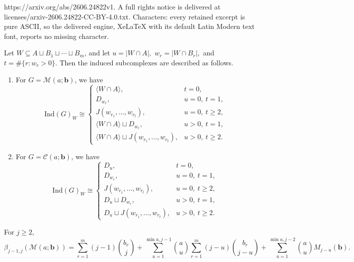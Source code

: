\documentclass[10pt,a4paper]{amsart}
\newcommand{\CC}{\mathcal{C}}
\newcommand{\MM}{\mathcal{M}}
\newcommand{\bk}[1]{\mathbf{#1}}
\newcommand{\ind}{\mathrm{Ind}}
\begin{document}
https://arxiv.org/abs/2606.24822v1. A full rights notice is delivered at licenses/arxiv-2606.24822-CC-BY-4.0.txt. Characters: every retained excerpt is pure ASCII, so the delivered engine, XeLaTeX with its default Latin Modern text font, reports no missing character.
	\begin{proposition}\label{prop:induced-models}
		Let $W\subseteq A\sqcup B_1\sqcup\cdots\sqcup B_m$, and let
		$ u=|W\cap A|, $ $ 	w_r=|W\cap B_r|, $ and $t=\#\{r:w_r>0\}. $ 	Then the induced subcomplexes are described as follows.
		
		\begin{enumerate}[label=\textup{(\roman*)},noitemsep]
			\item For $G=\MM(a;\bk{b})$, we have
			$$
			\ind(G)_W \cong
			\begin{cases}
				\langle W\cap A\rangle, & t=0,\\
				D_{w_r}, & u=0,\ t=1,\\
				J(w_{r_1},\dots,w_{r_t}), & u=0,\ t\geq 2,\\
				\langle W\cap A\rangle \sqcup D_{w_r}, & u>0,\ t=1,\\
				\langle W\cap A\rangle \sqcup J(w_{r_1},\dots,w_{r_t}), & u>0,\ t\geq 2.
			\end{cases}
			$$
			
			\item For $G=\CC(a;\bk{b})$, we have
			$$
			\ind(G)_W \cong
			\begin{cases}
				D_u, & t=0,\\
				D_{w_r}, & u=0,\ t=1,\\
				J(w_{r_1},\dots,w_{r_t}), & u=0,\ t\geq 2,\\
				D_u\sqcup D_{w_r}, & u>0,\ t=1,\\
				D_u\sqcup J(w_{r_1},\dots,w_{r_t}), & u>0,\ t\geq 2.
			\end{cases}
			$$
		\end{enumerate}
	\end{proposition}

	\begin{theorem}\label{thm:split-linear}
		For $j\geq 2$,
		$$
		\beta_{j-1,j}(\MM(a;\bk{b}))=
		\sum_{r=1}^m (j-1)\binom{b_r}{j}
		+
		\sum_{u=1}^{\min{a,j-1}}
		\binom{a}{u}
		\sum_{r=1}^m (j-u)\binom{b_r}{j-u}
		+
		\sum_{u=1}^{\min{a,j-2}}
		\binom{a}{u}M_{j-u}(\bk{b}).
		$$
	\end{theorem}
\end{document}
